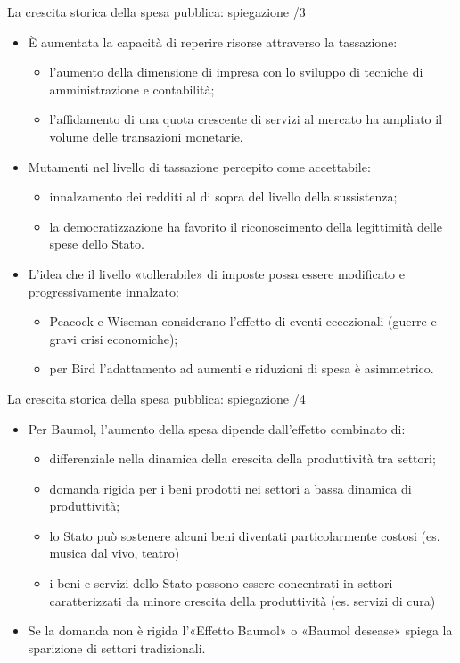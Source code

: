 \documentclass[aspectratio=64,12pt]{beamer}
\begin{document}
\begin{frame}{La crescita storica della spesa pubblica: spiegazione /3}
\begin{itemize}
\item È aumentata la capacità di reperire risorse attraverso la tassazione:
\begin{itemize}
\item l’aumento della dimensione di impresa con lo sviluppo di tecniche di amministrazione e contabilità;
\item l’affidamento di una quota crescente di servizi al mercato ha ampliato il volume delle transazioni monetarie.
\end{itemize}
\item Mutamenti nel livello di tassazione percepito come accettabile:
\begin{itemize}
\item innalzamento dei redditi al di sopra del livello della sussistenza;
\item la democratizzazione ha favorito il riconoscimento della legittimità delle spese dello Stato.
\end{itemize}
\item L’idea che il livello «tollerabile» di imposte possa essere modificato e progressivamente innalzato:
\begin{itemize}
\item Peacock e Wiseman considerano l’effetto di eventi eccezionali (guerre e gravi crisi economiche);
\item per Bird l’adattamento ad aumenti e riduzioni di spesa è asimmetrico.
\end{itemize}
\end{itemize}
\end{frame}


\begin{frame}{La crescita storica della spesa pubblica: spiegazione /4}
\begin{itemize}
\item Per Baumol, l’aumento della spesa dipende dall’effetto combinato di:
\begin{itemize}
\item differenziale nella dinamica della crescita della produttività tra settori;
\item domanda rigida per i beni prodotti nei settori a bassa dinamica di produttività;
\item lo Stato può sostenere alcuni beni diventati particolarmente costosi (es. musica dal vivo, teatro)
\item i beni e servizi dello Stato possono essere concentrati in settori caratterizzati da minore crescita della produttività (es. servizi di cura)
\end{itemize}
\item Se la domanda non è rigida l’«Effetto Baumol» o «Baumol desease» spiega la sparizione di settori tradizionali.
\end{itemize}
\end{frame}
\end{document}
